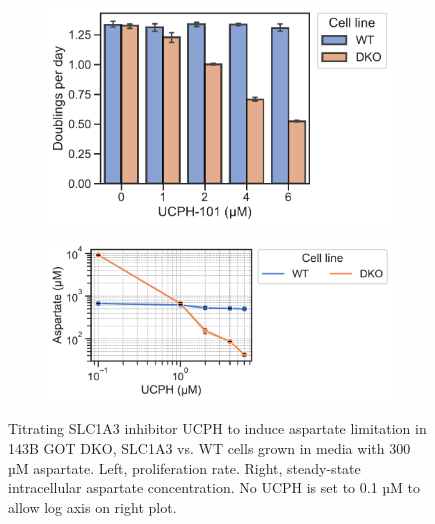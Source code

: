 \begin{figure}[!ht]
     \centering
     \begin{subfigure}[b]{0.4\textwidth}
         \includegraphics[width=\textwidth]{figures/sapp/DKO_char/143B_GOT-DKO_UCPH-tit_prlfr.pdf}
     \end{subfigure}
     \begin{subfigure}[b]{0.55\textwidth}
         \includegraphics[width=\textwidth]{figures/sapp/DKO_char/143B_GOT-DKO_UCPH-tit_asp.pdf}
     \end{subfigure}
     \hfill
        \caption[143B GOT DKO Asp titration using UCPH, proliferation]{
        Titrating SLC1A3 inhibitor UCPH to induce aspartate limitation in 143B GOT DKO, SLC1A3 vs. WT cells grown in media with 300 µM aspartate.
        Left, proliferation rate.
        Right, steady-state intracellular aspartate concentration.
        No UCPH is set to 0.1 µM to allow log axis on right plot.
        }
        \label{fig:sapp:tRNA:143B_DKO_UCPH_asp_prlfr}
\end{figure}

